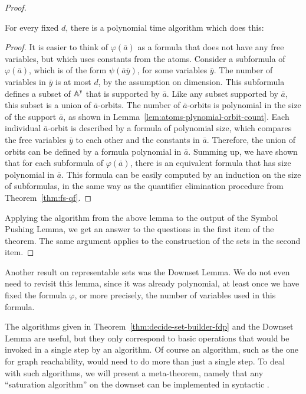 \begin{proof}
 \begin{lemma}
    For every fixed $d$, there is a polynomial time algorithm which does this:
 \end{lemma}
\begin{proof}
    It is easier to think of  $\varphi(\bar a)$ as a formula that does not have any free variables, but which uses constants from the atoms.  Consider a subformula of $\varphi(\bar a)$, which is of the form $\psi(\bar a \bar y)$, for some variables $\bar y$. The number of variables in $\bar y$ is at most $d$, by the assumption on dimension. This  subformula defines a subset of $\mathbb A^{\bar y}$ that is supported by $\bar a$. Like any subset supported by $\bar a$, this subset is a union of $\bar a$-orbits. The number of  $\bar a$-orbits  is polynomial in the size of the support $\bar a$, as shown in Lemma~\ref{lem:atoms-plynomial-orbit-count}. Each individual $\bar a$-orbit is described by a formula of polynomial size, which compares the free variables $\bar y$ to each other and the constants in $\bar a$. Therefore, the union of orbits can be defined by a formula polynomial in $\bar a$. Summing up, we have shown that for each subformula of $\varphi(\bar a)$, there is an equivalent formula that has size polynomial in $\bar a$. This formula can be easily computed by an induction on the size of subformulas, in the same way as the quantifier elimination procedure from Theorem~\ref{thm:fs-qf}. 
\end{proof}
Applying the algorithm from the above lemma to the output of the Symbol Pushing Lemma, we get an answer to the questions in the first item of the theorem. The same argument applies to the construction of the sets in the second item. 
\end{proof}



Another result on representable sets was the Downset Lemma. We do not even need to revisit this lemma, since it was already polynomial, at least once we have fixed the formula $\varphi$, or more precisely, the number of variables used in this formula. 


The algorithms given in Theorem~\ref{thm:decide-set-builder-fdp} and the Downset Lemma are useful, but they only correspond to basic operations that would be invoked in a single step by an algorithm. Of course an algorithm, such as the one for graph reachability, would need to do more than just a single step. To deal with such algorithms, we will present a meta-theorem, namely that any ``saturation algorithm'' on the downset can be implemented in syntactic \fdp. 




